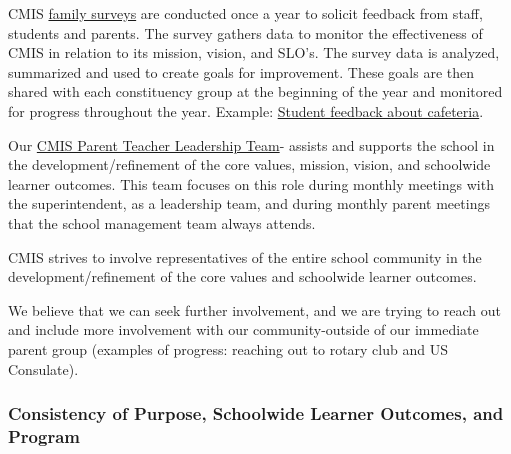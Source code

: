 \begin{findings}
CMIS \href{https://docs.google.com/a/cmis.ac.th/forms/d/16Gbd3MzQOXtjjZ2dG460xw5SHG_eohMIKet3lxYUdAY/prefill}{family surveys} are conducted once a year to solicit feedback from staff, students and parents. The survey gathers data to monitor the effectiveness of CMIS in relation to its mission, vision, and SLO’s. The survey data is analyzed, summarized and used to create goals for improvement. These goals are then shared with each constituency group at the beginning of the year and monitored for progress throughout the year. Example: \href{https://docs.google.com/a/cmis.ac.th/document/d/10w_OSr00xntX42ShaPk4PiNu9FjKP2OgA3g6CKjmEFc/edit?usp=sharing}{Student feedback about cafeteria}.

Our \href{http://blogs.cmis.ac.th/ptg/about/}{CMIS Parent Teacher Leadership Team}- assists and supports the school in the development/refinement of the core values, mission, vision, and schoolwide learner outcomes. This team focuses on this role during monthly meetings with the superintendent, as a leadership team, and during monthly parent meetings that the school management team always attends.


CMIS strives to involve representatives of the entire school community in the development/refinement of the core values and schoolwide learner outcomes.

We believe that we can seek further involvement, and we are trying to reach out and include more involvement with our community-outside of our immediate parent group (examples of progress: reaching out to rotary club and US Consulate).
\end{findings}

\subsubsection{Consistency of Purpose, Schoolwide Learner Outcomes, and Program}



